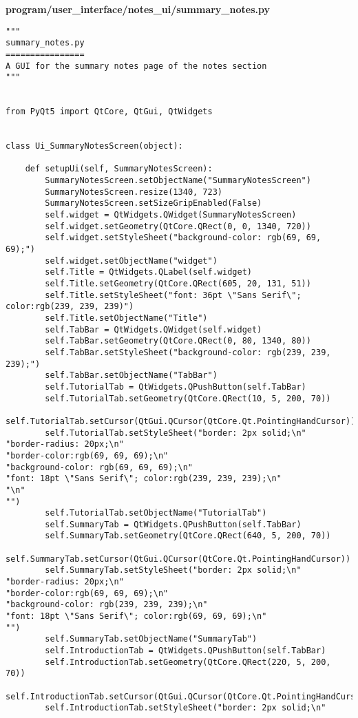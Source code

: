 \documentclass{article}
\begin{document}
\textbf{program/user\_interface/notes\_ui/summary\_notes.py}

\begin{lstlisting}
"""
summary_notes.py
================
A GUI for the summary notes page of the notes section
"""


from PyQt5 import QtCore, QtGui, QtWidgets


class Ui_SummaryNotesScreen(object):

    def setupUi(self, SummaryNotesScreen):
        SummaryNotesScreen.setObjectName("SummaryNotesScreen")
        SummaryNotesScreen.resize(1340, 723)
        SummaryNotesScreen.setSizeGripEnabled(False)
        self.widget = QtWidgets.QWidget(SummaryNotesScreen)
        self.widget.setGeometry(QtCore.QRect(0, 0, 1340, 720))
        self.widget.setStyleSheet("background-color: rgb(69, 69, 69);")
        self.widget.setObjectName("widget")
        self.Title = QtWidgets.QLabel(self.widget)
        self.Title.setGeometry(QtCore.QRect(605, 20, 131, 51))
        self.Title.setStyleSheet("font: 36pt \"Sans Serif\"; color:rgb(239, 239, 239)")
        self.Title.setObjectName("Title")
        self.TabBar = QtWidgets.QWidget(self.widget)
        self.TabBar.setGeometry(QtCore.QRect(0, 80, 1340, 80))
        self.TabBar.setStyleSheet("background-color: rgb(239, 239, 239);")
        self.TabBar.setObjectName("TabBar")
        self.TutorialTab = QtWidgets.QPushButton(self.TabBar)
        self.TutorialTab.setGeometry(QtCore.QRect(10, 5, 200, 70))
        self.TutorialTab.setCursor(QtGui.QCursor(QtCore.Qt.PointingHandCursor))
        self.TutorialTab.setStyleSheet("border: 2px solid;\n"
"border-radius: 20px;\n"
"border-color:rgb(69, 69, 69);\n"
"background-color: rgb(69, 69, 69);\n"
"font: 18pt \"Sans Serif\"; color:rgb(239, 239, 239);\n"
"\n"
"")
        self.TutorialTab.setObjectName("TutorialTab")
        self.SummaryTab = QtWidgets.QPushButton(self.TabBar)
        self.SummaryTab.setGeometry(QtCore.QRect(640, 5, 200, 70))
        self.SummaryTab.setCursor(QtGui.QCursor(QtCore.Qt.PointingHandCursor))
        self.SummaryTab.setStyleSheet("border: 2px solid;\n"
"border-radius: 20px;\n"
"border-color:rgb(69, 69, 69);\n"
"background-color: rgb(239, 239, 239);\n"
"font: 18pt \"Sans Serif\"; color:rgb(69, 69, 69);\n"
"")
        self.SummaryTab.setObjectName("SummaryTab")
        self.IntroductionTab = QtWidgets.QPushButton(self.TabBar)
        self.IntroductionTab.setGeometry(QtCore.QRect(220, 5, 200, 70))
        self.IntroductionTab.setCursor(QtGui.QCursor(QtCore.Qt.PointingHandCursor))
        self.IntroductionTab.setStyleSheet("border: 2px solid;\n"

\end{lstlisting}
\end{document}
